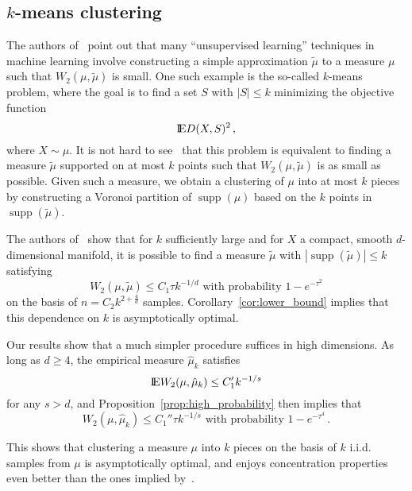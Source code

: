 \documentclass[sts]{imsart}
\DeclareMathOperator{\supp}{supp}
\begin{document}
\subsection{$k$-means clustering}
The authors of~\cite{GuiRos12} point out that many ``unsupervised learning'' techniques in machine learning involve constructing a simple approximation $\tilde \mu$ to a measure $\mu$ such that $W_2(\mu, \tilde \mu)$ is small.
One such example is the so-called $k$-means problem, where the goal is to find a set $S$ with $|S|\leq k$ minimizing the objective function
\begin{equation*}
{\rm I}\kern-0.18em{\rm E} D(X, S)^2\,,
\end{equation*}
where $X \sim \mu$.
It is not hard to see~\cite[Lemma~3.1]{GuiRos12} that this problem is equivalent to finding a measure $\tilde \mu$ supported on at most $k$ points such that $W_2(\mu, \tilde \mu)$ is as small as possible.
Given such a measure, we obtain a clustering of $\mu$ into at most $k$ pieces by constructing a Voronoi partition of $\supp(\mu)$ based on the $k$ points in $\supp(\tilde \mu)$.

The authors of~\cite{GuiRos12} show that for $k$ sufficiently large and for $X$ a compact, smooth $d$-dimensional manifold, it is possible to find a measure $\tilde \mu$ with $|\supp(\tilde \mu)| \leq k$ satisfying
\begin{equation*}
W_2(\mu, \tilde \mu) \leq C_1 \tau k^{-1/d} \text{ with probability $1 - e^{-\tau^2}$}
\end{equation*}
on the basis of $n = C_2 k^{2 + \frac 4 d}$ samples.
Corollary~\ref{cor:lower_bound} implies that this dependence on $k$ is asymptotically optimal.

Our results show that a much simpler procedure suffices in high dimensions.
As long as $d \geq 4$, the empirical measure $\hat \mu_k$ satisfies
\begin{equation*}
{\rm I}\kern-0.18em{\rm E} W_2(\mu, \hat \mu_k) \leq C_1' k^{-1/s}
\end{equation*}
for any $s > d$, and Proposition~\ref{prop:high_probability} then implies that
\begin{equation*}
W_2(\mu, \hat \mu_k) \leq C_1'' \tau k^{-1/s} \text{ with probability $1 - e^{-\tau^4}$}\,.
\end{equation*}

This shows that clustering a measure $\mu$ into $k$ pieces on the basis of $k$ i.i.d. samples from $\mu$ is asymptotically optimal, and enjoys concentration properties even better than the ones implied by~\cite{GuiRos12}.
\end{document}
